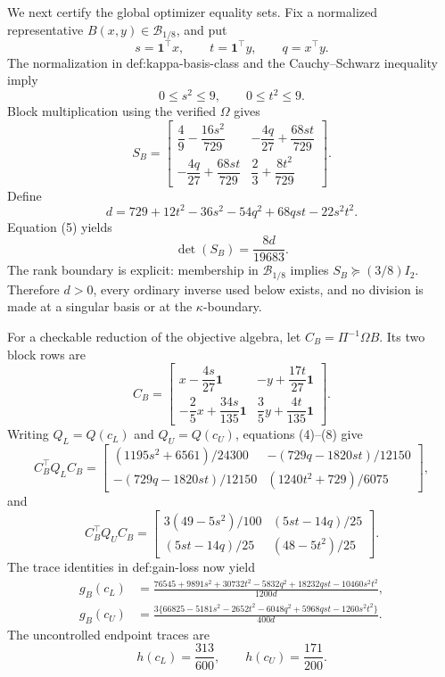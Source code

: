 We next certify the global optimizer equality sets.  Fix a normalized representative \(B(x,y)\in\mathcal B_{1/8}\), and put
\[
 s=\mathbf 1^{\top}x,
 \qquad
 t=\mathbf 1^{\top}y,
 \qquad
 q=x^{\top}y.
\]
The normalization in def:kappa-basis-class and the Cauchy--Schwarz inequality imply
\[
 0\le s^2\le9,
 \qquad
 0\le t^2\le9.
 \tag{4}
\]
Block multiplication using the verified \(\Omega\) gives
\[
 S_B=
 \begin{bmatrix}
 \dfrac49-\dfrac{16s^2}{729}&-\dfrac{4q}{27}+\dfrac{68st}{729}\\[4pt]
 -\dfrac{4q}{27}+\dfrac{68st}{729}&\dfrac23+\dfrac{8t^2}{729}
 \end{bmatrix}.
 \tag{5}
\]
Define
\[
 d=729+12t^2-36s^2-54q^2+68qst-22s^2t^2.
 \tag{6}
\]
Equation (5) yields
\[
 \det(S_B)=\frac{8d}{19683}.
 \tag{7}
\]
The rank boundary is explicit: membership in \(\mathcal B_{1/8}\) implies \(S_B\succeq(3/8)I_2\).  Therefore \(d>0\), every ordinary inverse used below exists, and no division is made at a singular basis or at the \(\kappa\)-boundary.

For a checkable reduction of the objective algebra, let \(C_B=\Pi^{-1}\Omega B\).  Its two block rows are
\[
 C_B=
 \begin{bmatrix}
 x-\dfrac{4s}{27}\mathbf1&-y+\dfrac{17t}{27}\mathbf1\\[3pt]
 -\dfrac25x+\dfrac{34s}{135}\mathbf1&\dfrac35y+\dfrac{4t}{135}\mathbf1
 \end{bmatrix}.
 \tag{8}
\]
Writing \(Q_L=Q(c_L)\) and \(Q_U=Q(c_U)\), equations (4)--(8) give
\[
 C_B^{\top}Q_LC_B=
 \begin{bmatrix}
 (1195s^2+6561)/24300&-(729q-1820st)/12150\\
 -(729q-1820st)/12150&(1240t^2+729)/6075
 \end{bmatrix},
 \tag{9}
\]
and
\[
 C_B^{\top}Q_UC_B=
 \begin{bmatrix}
 3(49-5s^2)/100&(5st-14q)/25\\
 (5st-14q)/25&(48-5t^2)/25
 \end{bmatrix}.
 \tag{10}
\]
The trace identities in def:gain-loss now yield
\[
 \begin{split}
 g_B(c_L)
 &=\frac{76545+9891s^2+30732t^2-5832q^2+18232qst-10460s^2t^2}{1200d},\\
 g_B(c_U)
 &=\frac{3\{66825-5181s^2-2652t^2-6048q^2+5968qst-1260s^2t^2\}}{400d}.
 \end{split}
 \tag{11}
\]
The uncontrolled endpoint traces are
\[
 h(c_L)=\frac{313}{600},
 \qquad
 h(c_U)=\frac{171}{200}.
 \tag{12}
\]

